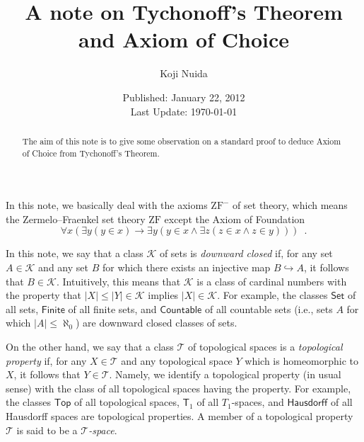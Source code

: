 \documentclass{article}
\title{A note on Tychonoff's Theorem and Axiom of Choice}
\author{Koji Nuida}
\date{Published: January 22, 2012\medskip \\ Last Update: \today}
\begin{document}
\maketitle

\begin{abstract}
The aim of this note is to give some observation on a standard proof to deduce Axiom of Choice from Tychonoff's Theorem.
\end{abstract}

In this note, we basically deal with the axioms $\mathrm{ZF}^-$ of set theory, which means the Zermelo--Fraenkel set theory $\mathrm{ZF}$ except the Axiom of Foundation
\begin{displaymath}
\forall x (\exists y (y \in x) \to \exists y (y \in x \land \exists z (z \in x \land z \in y))) \enspace.
\end{displaymath}

In this note, we say that a class $\mathcal{K}$ of sets is \emph{downward closed} if, for any set $A \in \mathcal{K}$ and any set $B$ for which there exists an injective map $B \hookrightarrow A$, it follows that $B \in \mathcal{K}$.
Intuitively, this means that $\mathcal{K}$ is a class of cardinal numbers with the property that $|X| \leq |Y| \in \mathcal{K}$ implies $|X| \in \mathcal{K}$.
For example, the classes $\mathsf{Set}$ of all sets, $\mathsf{Finite}$ of all finite sets, and $\mathsf{Countable}$ of all countable sets (i.e., sets $A$ for which $|A| \leq \aleph_0$) are downward closed classes of sets.

On the other hand, we say that a class $\mathcal{T}$ of topological spaces is a \emph{topological property} if, for any $X \in \mathcal{T}$ and any topological space $Y$ which is homeomorphic to $X$, it follows that $Y \in \mathcal{T}$.
Namely, we identify a topological property (in usual sense) with the class of all topological spaces having the property.
For example, the classes $\mathsf{Top}$ of all topological spaces, $\mathsf{T}_1$ of all $T_1$-spaces, and $\mathsf{Hausdorff}$ of all Hausdorff spaces are topological properties.
A member of a topological property $\mathcal{T}$ is said to be a \emph{$\mathcal{T}$-space}.
\end{document}
